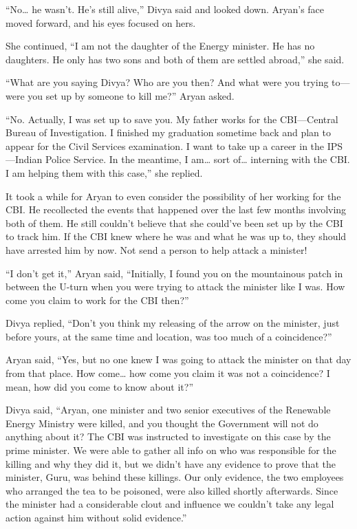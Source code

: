 “No… he wasn't. He's still alive,” Divya said and looked down. Aryan's face
moved forward, and his eyes focused on hers.

She continued, “I am not the daughter of the Energy minister. He has no
daughters. He only has two sons and both of them are settled abroad,” she said.

“What are you saying Divya? Who are you then? And what were you trying to—were
you set up by someone to kill me?” Aryan asked.

“No. Actually, I was set up to save you. My father works for the CBI—Central
Bureau of Investigation. I finished my graduation sometime back and plan to
appear for the Civil Services examination. I want to take up a career in the 
IPS—Indian Police Service. In the meantime, I am… sort of… interning with
the CBI. I am helping them with this case,” she replied.

It took a while for Aryan to even consider the possibility of her working for
the CBI. He recollected the events that happened over the last few months
involving both of them. He still couldn't believe that she could've been set up
by the CBI to track him. If the CBI knew where he was and what he was up to,
they should have arrested him by now. Not send a person to help attack a
minister!

“I don't get it,” Aryan said, “Initially, I found you on the mountainous patch
in between the U-turn when you were trying to attack the minister like I was.
How come you claim to work for the CBI then?”

Divya replied, “Don't you think my releasing of the arrow on the minister, just
before yours, at the same time and location, was too much of a coincidence?”

Aryan said, “Yes, but no one knew I was going to attack the minister on that day
from that place. How come… how come you claim it was not a coincidence? I
mean, how did you come to know about it?”

Divya said, “Aryan, one minister and two senior executives of the Renewable
Energy Ministry were killed, and you thought the Government will not do
anything about it? The CBI was instructed to investigate on this case by the
prime minister. We were able to gather all info on who was responsible for the
killing and why they did it, but we didn't have any evidence to prove that the
minister, Guru, was behind these killings. Our only evidence, the two employees
who arranged the tea to be poisoned, were also killed shortly afterwards. Since
the minister had a considerable clout and influence we couldn't take any legal
action against him without solid evidence.”


